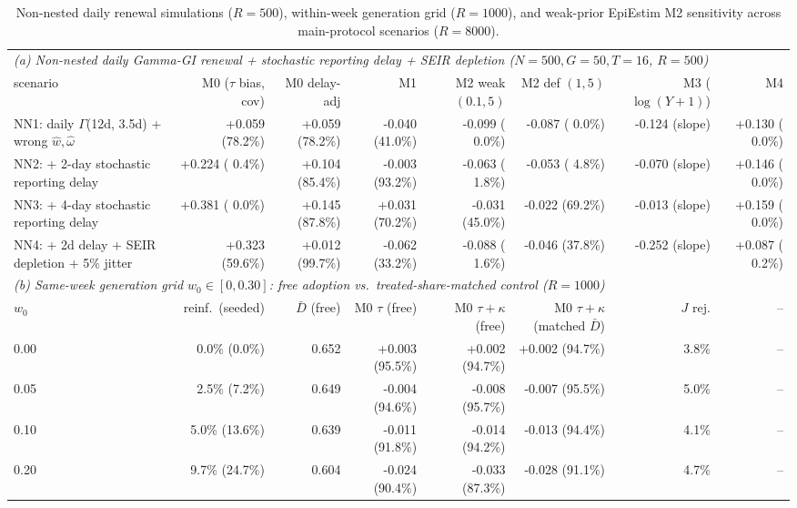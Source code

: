 \begin{table}[!t]
\centering
\caption{Non-nested daily renewal simulations ($R=500$), within-week generation grid ($R=1000$), and weak-prior EpiEstim M2 sensitivity across main-protocol scenarios ($R=8000$).}
\label{tab:rev-nonnested}
\footnotesize
\setlength{\tabcolsep}{2.6pt}
\begin{adjustbox}{max width=\linewidth}
\begin{tabular}{lrrrrrrr}
\toprule
\multicolumn{8}{l}{\emph{(a) Non-nested daily Gamma-GI renewal + stochastic reporting delay + SEIR depletion ($N=500, G=50, T=16$, $R=500$)}} \\
scenario & M0 ($\tau$ bias, cov) & M0 delay-adj & M1 & M2 weak $(0.1,5)$ & M2 def $(1,5)$ & M3 ($\log(Y+1)$) & M4 \\
\midrule
NN1: daily $\Gamma$(12d, 3.5d) + wrong $\hat w,\hat\omega$ & +0.059 (78.2\%) & +0.059 (78.2\%) & -0.040 (41.0\%) & -0.099 ( 0.0\%) & -0.087 ( 0.0\%) & -0.124 (slope) & +0.130 ( 0.0\%) \\
NN2: + 2-day stochastic reporting delay & +0.224 ( 0.4\%) & +0.104 (85.4\%) & -0.003 (93.2\%) & -0.063 ( 1.8\%) & -0.053 ( 4.8\%) & -0.070 (slope) & +0.146 ( 0.0\%) \\
NN3: + 4-day stochastic reporting delay & +0.381 ( 0.0\%) & +0.145 (87.8\%) & +0.031 (70.2\%) & -0.031 (45.0\%) & -0.022 (69.2\%) & -0.013 (slope) & +0.159 ( 0.0\%) \\
NN4: + 2d delay + SEIR depletion + 5\% jitter & +0.323 (59.6\%) & +0.012 (99.7\%) & -0.062 (33.2\%) & -0.088 ( 1.6\%) & -0.046 (37.8\%) & -0.252 (slope) & +0.087 ( 0.2\%) \\
\midrule
\multicolumn{8}{l}{\emph{(b) Same-week generation grid $w_0 \in [0, 0.30]$: free adoption vs.\ treated-share-matched control ($R=1000$)}} \\
$w_0$ & reinf.\ (seeded) & $\bar D$ (free) & M0 $\tau$ (free) & M0 $\tau+\kappa$ (free) & M0 $\tau+\kappa$ (matched $\bar D$) & $J$ rej. & -- \\
\midrule
0.00 & 0.0\% (0.0\%) & 0.652 & +0.003 (95.5\%) & +0.002 (94.7\%) & +0.002 (94.7\%) & 3.8\% & -- \\
0.05 & 2.5\% (7.2\%) & 0.649 & -0.004 (94.6\%) & -0.008 (95.7\%) & -0.007 (95.5\%) & 5.0\% & -- \\
0.10 & 5.0\% (13.6\%) & 0.639 & -0.011 (91.8\%) & -0.014 (94.2\%) & -0.013 (94.4\%) & 4.1\% & -- \\
0.20 & 9.7\% (24.7\%) & 0.604 & -0.024 (90.4\%) & -0.033 (87.3\%) & -0.028 (91.1\%) & 4.7\% & -- \\

\end{tabular}
\end{adjustbox}
\end{table}
